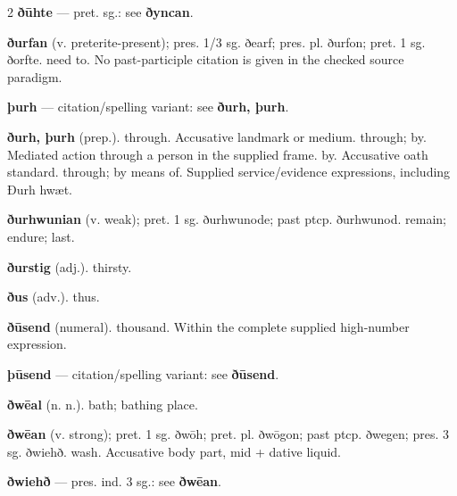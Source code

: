 \begin{multicols*}{2}
\textbf{ðūhte} — pret. sg.: see \textbf{ðyncan}.\par
\textbf{ðurfan} (v. preterite-present); pres. 1/3 sg. ðearf; pres. pl. ðurfon; pret. 1 sg. ðorfte. need to. No past-participle citation is given in the checked source paradigm.\par
\textbf{þurh} — citation/spelling variant: see \textbf{ðurh, þurh}.\par
\textbf{ðurh, þurh} (prep.). through. Accusative landmark or medium. through; by. Mediated action through a person in the supplied frame. by. Accusative oath standard. through; by means of. Supplied service/evidence expressions, including Ðurh hwæt.\par
\textbf{ðurhwunian} (v. weak); pret. 1 sg. ðurhwunode; past ptcp. ðurhwunod. remain; endure; last.\par
\textbf{ðurstig} (adj.). thirsty.\par
\textbf{ðus} (adv.). thus.\par
\textbf{ðūsend} (numeral). thousand. Within the complete supplied high-number expression.\par
\textbf{þūsend} — citation/spelling variant: see \textbf{ðūsend}.\par
\textbf{ðwēal} (n. n.). bath; bathing place.\par
\textbf{ðwēan} (v. strong); pret. 1 sg. ðwōh; pret. pl. ðwōgon; past ptcp. ðwegen; pres. 3 sg. ðwiehð. wash. Accusative body part, mid + dative liquid.\par
\textbf{ðwiehð} — pres. ind. 3 sg.: see \textbf{ðwēan}.\par

\end{multicols*}
